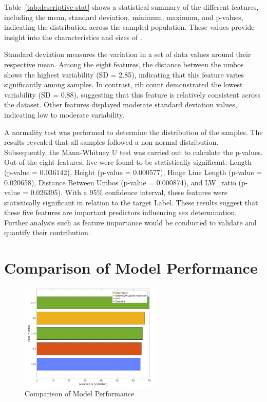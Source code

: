 Table~\ref{tab:descriptive-stat} shows a statistical summary of the different features, including the mean, standard deviation, minimum, maximum, and p-values, indicating the distribution across the sampled population. These values provide insight into the characteristics and sizes of  \Tgranosa. 

Standard deviation measures the variation in a set of data values around their respective mean. Among the eight features, the distance between the umbos shows the highest variability (SD = 2.85), indicating that this feature varies significantly among samples. In contrast, rib count demonstrated the lowest variability (SD = 0.88), suggesting that this feature is relatively consistent across the dataset. Other features displayed moderate standard deviation values, indicating low to moderate variability.

A normality test was performed to determine the distribution of the samples. The results revealed that all samples followed a non-normal distribution. Subsequently, the Mann-Whitney U test was carried out to calculate the p-values. Out of the eight features, five were found to be statistically significant: Length (p-value = 0.036142), Height (p-value = 0.000577), Hinge Line Length (p-value = 0.020658), Distance Between Umbos (p-value = 0.000874), and LW\_ratio (p-value = 0.026395). With a 95\% confidence interval, these features were statistically significant in relation to the target Label. These results suggest that these five features are important predictors influencing sex determination. Further analysis such as feature importance would be conducted to validate and quantify their contribution.  


\section{Comparison of Model Performance}
\begin{figure}[!htbp]
	\centering
	\includegraphics[width=0.6\textwidth]{figures/compare-models.png}
	\caption{Comparison of Model Performance}
	\label{fig:compare-models}
\end{figure}

